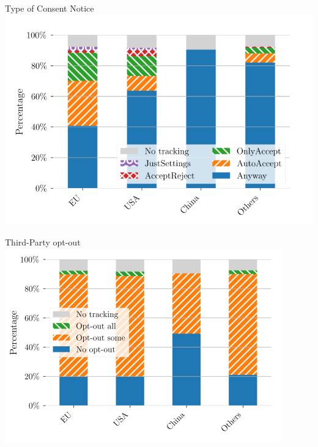 \documentclass[xcolor={dvipsnames}]{beamer}
\begin{document}
\begin{frame}{Type of Consent Notice}
    \centering
    \includegraphics[scale=0.4]{figures/cookie_notice_type_trans.png}
\end{frame}

\begin{frame}{Third-Party opt-out}
    \centering
    \includegraphics[scale=0.58]{figures/third_party_trans.png}
\end{frame}
\end{document}
